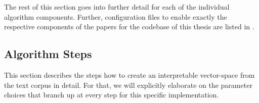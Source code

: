 The rest of this section goes into further detail for each of the individual algorithm components.  Further, configuration files to enable exactly the respective components of the papers \mainalgos for the codebase of this thesis are listed in .






\subsection{Algorithm Steps}
\label{sec:algorithm_steps}


This section describes the steps how to create an interpretable vector-space from the text corpus in detail. For that, we will explicitly elaborate on the parameter choices that branch up at every step for this specific implementation. %

